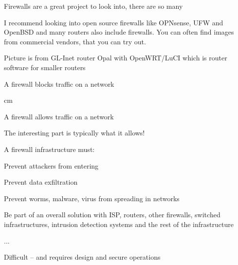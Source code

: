 \documentclass[Screen16to9,17pt]{foils}
\begin{document}




\begin{list2}
\item Firewalls are a great project to look into, there are so many \smiley
\item I recommend looking into open source firewalls like OPNsense, UFW and OpenBSD and many routers also include firewalls. You can often find images from commercial vendors, that you can try out.
\item Picture is from GL-Inet router Opal with OpenWRT/LuCI which is router software for smaller routers
\end{list2}




\centerline{\hlkbig A firewall {\color{security6blue}blocks traffic} on a network}

 cm
\pause

\centerline{\hlkbig A firewall {\color{red}allows traffic} on a network}
{\small The interesting part is typically what it allows!}

\begin{list1}
\item A firewall infrastructure must:
\begin{list2}
\item Prevent attackers from entering
\item Prevent data exfiltration
\item Prevent worms, malware, virus from spreading in networks
\item Be part of an overall solution with ISP, routers, other firewalls, switched infrastructures,
  intrusion detection systems and the rest of the infrastructure
\item ...
\end{list2}
\end{list1}

\vskip 5mm
\centerline{Difficult -- and requires design and secure operations}


\end{document}
